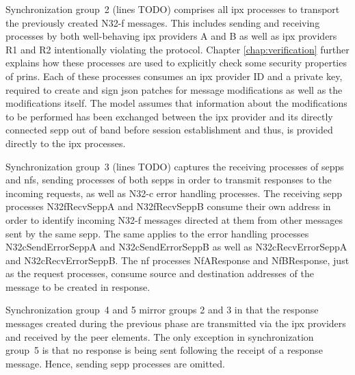 Synchronization group~2 (lines TODO) comprises all \gls{ipx} processes to transport the previously created N32-f messages.
This includes sending and receiving processes by both well-behaving \gls{ipx} providers A and B as well as \gls{ipx} providers R1 and R2 intentionally violating the protocol.
Chapter \ref{chap:verification} further explains how these processes are used to explicitly check some security properties of \gls{prins}.
Each of these processes consumes an \gls{ipx} provider ID and a private key, required to create and sign \gls{json} patches for message modifications as well as the modifications itself.
The model assumes that information about the modifications to be performed has been exchanged between the \gls{ipx} provider and its directly connected \gls{sepp} out of band before session establishment and thus, is provided directly to the \gls{ipx} processes.

Synchronization group~3 (lines TODO) captures the receiving processes of \glspl{sepp} and \glspl{nf}, sending processes of both \glspl{sepp} in order to transmit responses to the incoming requests, as well as N32-c error handling processes.
The receiving \gls{sepp} processes {\sffamily N32fRecvSeppA} and {\sffamily N32fRecvSeppB} consume their own address in order to identify incoming N32-f messages directed at them from other messages sent by the same \gls{sepp}.
The same applies to the error handling processes {\sffamily N32cSendErrorSeppA} and {\sffamily N32cSendErrorSeppB} as well as {\sffamily N32cRecvErrorSeppA} and {\sffamily N32cRecvErrorSeppB}.
The \gls{nf} processes {\sffamily NfAResponse} and {\sffamily NfBResponse}, just as the request processes, consume source and destination addresses of the message to be created in response.

Synchronization group~4 and 5 mirror groups 2 and 3 in that the response messages created during the previous phase are transmitted via the \gls{ipx} providers and received by the peer elements.
The only exception in synchronization group~5 is that no response is being sent following the receipt of a response message. Hence, sending \gls{sepp} processes are omitted.

